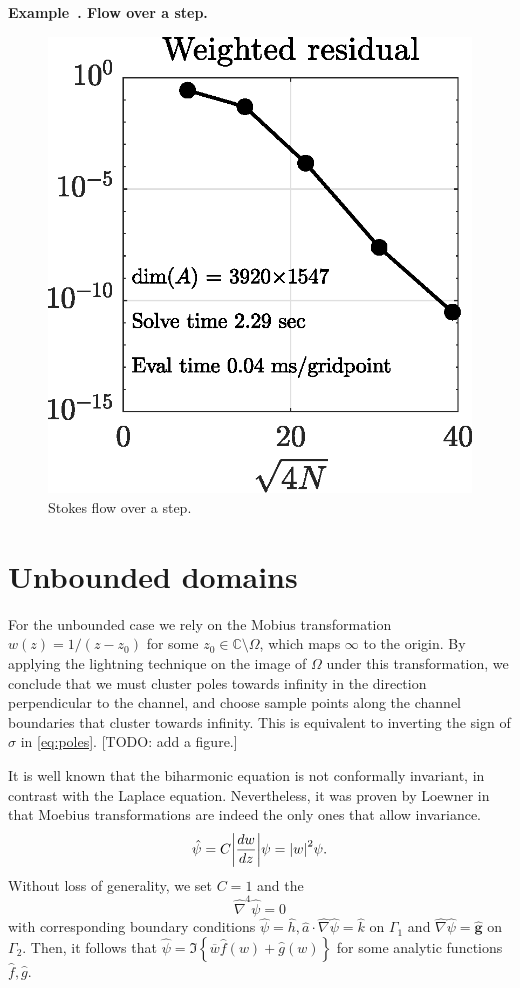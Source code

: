 \documentclass{article}
\newcounter{example}[section]
\newenvironment{example}[1][]{\refstepcounter{example}\par\medskip
	\textbf{Example~\theexample. #1} \rmfamily}{\medskip}
\renewcommand{\vec}[1]{\mathbf{#1}}
\newcommand{\conj}[1]{{\overline{#1}}}
\newcommand{\imag}[1]{{\Im\left\{#1\right\}}}
\begin{document}
\begin{example}[Flow over a step.]
\begin{figure}[H]
	\vspace{2em}
	\includegraphics[width=0.4\linewidth]{Figures/step_conv}

	\caption{Stokes flow over a step.}
	\label{fig:step}
\end{figure} 
\end{example}

\section{Unbounded domains \label{sec:unbounded}}

For the unbounded case we rely on the Mobius transformation $w(z)=1/(z-z_0)$
for some $z_0 \in \mathbb{C}\setminus\Omega$, which maps $\infty$ to the origin. By applying the lightning technique on the image of
$\Omega$ under this transformation, we
conclude that we must cluster poles towards infinity in the direction
perpendicular to the channel, and choose sample points along the channel
boundaries that cluster towards infinity.  This is equivalent to inverting the
sign of $\sigma$ in \eqref{eq:poles}.  [TODO: add a figure.]




It is well known that the biharmonic equation is not conformally invariant, in contrast with the Laplace equation. Nevertheless, it was proven by Loewner in \cite{loewner53} that Moebius transformations are indeed the only ones that allow invariance.
\begin{equation}
\hat{\psi} = C \abs{\frac{dw}{dz}}\psi = \abs{w}^2 \psi.
\end{equation} 
Without loss of generality, we set $C=1$ and the 
\begin{equation}
\hat{\nabla}^4\hat{\psi} = 0
\end{equation}
with corresponding boundary conditions
$\hat{\psi}=\hat{h}, \hat{a}\cdot \hat{\nabla}\hat{\psi} = \hat{k}$ on $\Gamma_1$ and $\hat{\nabla}\hat{\psi}=\hat{\vec{g}}$ on $\Gamma_2$. Then, it follows that $\hat{\psi} = \imag{\conj{w}\hat{f}(w) + \hat{g}(w)}$ for some analytic functions $\hat{f}, \hat{g}$.
\end{document}
